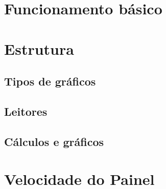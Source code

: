 \section{Funcionamento básico}
\section{Estrutura}
    \subsection{Tipos de gráficos}
    \subsection{Leitores}
    \subsection{Cálculos e gráficos}
\section{Velocidade do Painel}